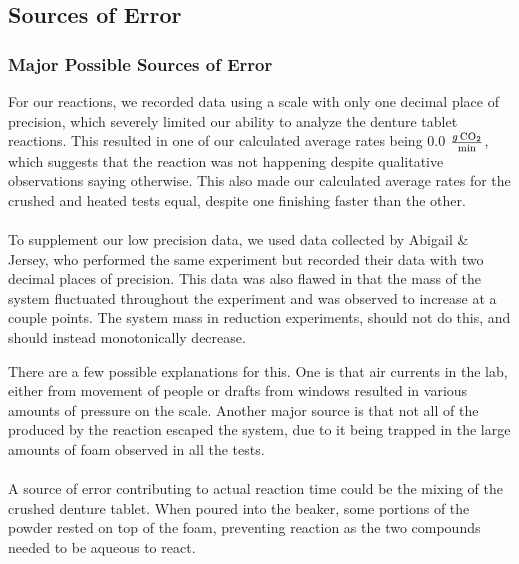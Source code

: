 \subsection{Sources of Error} \label{subsec:sources-of-error}
\subsubsection{Major Possible Sources of Error}
For our reactions, we recorded data using a scale with only one decimal place of precision, which severely limited our ability to analyze the denture tablet reactions. This resulted in one of our calculated average rates being 0.0 $\defunits$, which suggests that the reaction was not happening despite qualitative observations saying otherwise. This also made our calculated average rates for the crushed and heated tests equal, despite one finishing faster than the other.
\\~\\
To supplement our low precision data, we used data collected by Abigail \& Jersey, who performed the same experiment but recorded their data with two decimal places of precision. This data was also flawed in that the mass of the system fluctuated throughout the experiment and was observed to increase at a couple points. The system mass in reduction experiments, should not do this, and should instead monotonically decrease.

There are a few possible explanations for this. One is that air currents in the lab, either from movement of people or drafts from windows resulted in various amounts of pressure on the scale. Another major source is that not all of the  produced by the reaction escaped the system, due to it being trapped in the large amounts of foam observed in all the tests.
\\~\\
A source of error contributing to actual reaction time could be the mixing of the crushed denture tablet. When poured into the beaker, some portions of the powder rested on top of the foam, preventing reaction as the two compounds needed to be aqueous to react.

